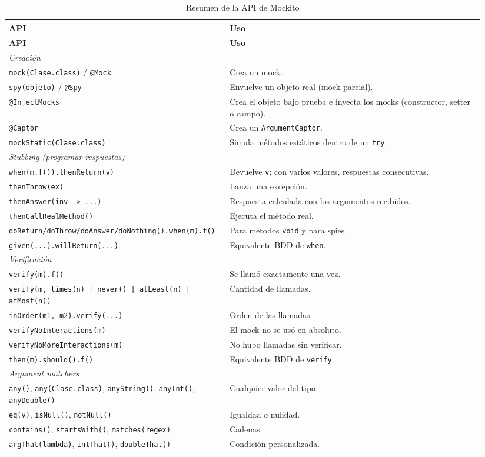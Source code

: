 \documentclass[11pt,a4paper,oneside]{report}
\newcommand{\code}[1]{\texttt{#1}}
\begin{document}
\begin{longtable}{p{0.42\linewidth}p{0.52\linewidth}}
\caption{Resumen de la API de Mockito}\\
\toprule
\textbf{API} & \textbf{Uso}\\
\midrule
\endfirsthead
\toprule
\textbf{API} & \textbf{Uso}\\
\midrule
\endhead
\multicolumn{2}{l}{\textit{Creación}}\\
\code{mock(Clase.class)} / \code{@Mock} & Crea un mock.\\
\code{spy(objeto)} / \code{@Spy} & Envuelve un objeto real (mock parcial).\\
\code{@InjectMocks} & Crea el objeto bajo prueba e inyecta los mocks (constructor, setter o campo).\\
\code{@Captor} & Crea un \code{ArgumentCaptor}.\\
\code{mockStatic(Clase.class)} & Simula métodos estáticos dentro de un \code{try}.\\
\midrule
\multicolumn{2}{l}{\textit{Stubbing (programar respuestas)}}\\
\code{when(m.f()).thenReturn(v)} & Devuelve \code{v}; con varios valores, respuestas consecutivas.\\
\code{thenThrow(ex)} & Lanza una excepción.\\
\code{thenAnswer(inv -> ...)} & Respuesta calculada con los argumentos recibidos.\\
\code{thenCallRealMethod()} & Ejecuta el método real.\\
\code{doReturn/doThrow/doAnswer/doNothing().when(m).f()} & Para métodos \code{void} y para spies.\\
\code{given(...).willReturn(...)} & Equivalente BDD de \code{when}.\\
\midrule
\multicolumn{2}{l}{\textit{Verificación}}\\
\code{verify(m).f()} & Se llamó exactamente una vez.\\
\code{verify(m, times(n) | never() | atLeast(n) | atMost(n))} & Cantidad de llamadas.\\
\code{inOrder(m1, m2).verify(...)} & Orden de las llamadas.\\
\code{verifyNoInteractions(m)} & El mock no se usó en absoluto.\\
\code{verifyNoMoreInteractions(m)} & No hubo llamadas sin verificar.\\
\code{then(m).should().f()} & Equivalente BDD de \code{verify}.\\
\midrule
\multicolumn{2}{l}{\textit{Argument matchers}}\\
\code{any()}, \code{any(Clase.class)}, \code{anyString()}, \code{anyInt()}, \code{anyDouble()} & Cualquier valor del tipo.\\
\code{eq(v)}, \code{isNull()}, \code{notNull()} & Igualdad o nulidad.\\
\code{contains()}, \code{startsWith()}, \code{matches(regex)} & Cadenas.\\
\code{argThat(lambda)}, \code{intThat()}, \code{doubleThat()} & Condición personalizada.\\
\bottomrule
\end{longtable}
\end{document}
